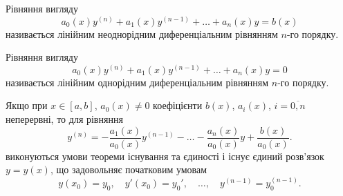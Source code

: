 Рівняння вигляду
\begin{equation*}
	a_0(x) y^{(n)} + a_1(x) y^{(n - 1)} + \ldots + a_n(x) y = b(x)
\end{equation*} 
називається лінійним неоднорідним диференціальним рівнянням $n$-го порядку. \parvskip

Рівняння вигляду
\begin{equation*}
	a_0(x) y^{(n)} + a_1(x) y^{(n - 1)} + \ldots + a_n(x) y = 0
\end{equation*} 
називається лінійним однорідним диференціальним рівнянням $n$-го порядку. \parvskip

Якщо при $x \in [a, b]$, $a_0(x) \ne 0$ коефіцієнти $b(x)$, $a_i(x)$, $i=\overline{0,n}$ неперервні, то для рівняння
\begin{equation*}
	y^{(n)} = - \frac{a_1(x)}{a_0(x)} y^{(n - 1)} - \ldots - \frac{a_n(x)}{a_0(x)} y + \frac{b(x)}{a_0(x)}.
\end{equation*}
виконуються умови теореми існування та єдиності і існує єдиний роз\-в'яз\-ок $y = y(x)$, що задовольняє початковим умовам
\begin{equation*}
	y(x_0) = y_0, \quad y'(x_0) = y_0', \quad \ldots, \quad y^{(n - 1)} = y_0^{(n - 1)}.
\end{equation*}
